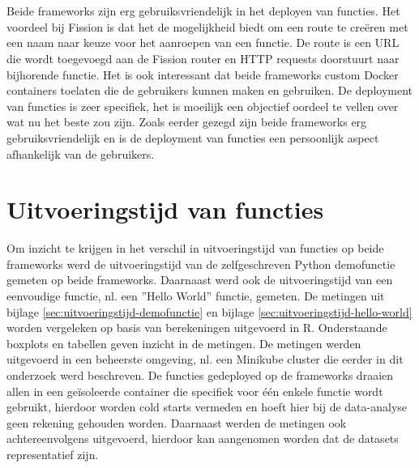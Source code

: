 \\\\
Beide frameworks zijn erg gebruiksvriendelijk in het deployen van functies. Het voordeel bij Fission is dat het de mogelijkheid biedt om een route te creëren met een naam naar keuze voor het aanroepen van een functie. De route is een URL die wordt toegevoegd aan de Fission router en HTTP requests doorstuurt naar bijhorende functie. Het is ook interessant dat beide frameworks custom Docker containers toelaten die de gebruikers kunnen maken en gebruiken.
De deployment van functies is zeer specifiek, het is moeilijk een objectief oordeel te vellen over wat nu het beste zou zijn. Zoals eerder gezegd zijn beide frameworks erg gebruiksvriendelijk en is de deployment van functies een persoonlijk aspect afhankelijk van de gebruikers.

\section{Uitvoeringstijd van functies}
\label{sec:vergelijking-uitvoeringstijd}
Om inzicht te krijgen in het verschil in uitvoeringstijd van functies op beide frameworks werd de uitvoeringstijd van de zelfgeschreven Python demofunctie gemeten op beide frameworks. Daarnaast werd ook de uitvoeringstijd van een eenvoudige functie, nl. een ''Hello World'' functie, gemeten. De metingen uit bijlage \ref{sec:uitvoeringstijd-demofunctie} en bijlage \ref{sec:uitvoeringstijd-hello-world} worden vergeleken op basis van  berekeningen uitgevoerd in R. Onderstaande boxplots en tabellen geven inzicht in de metingen. De metingen werden uitgevoerd in een beheerste omgeving, nl. een Minikube cluster die eerder in dit onderzoek werd beschreven. De functies gedeployed op de frameworks draaien allen in een geïsoleerde container die specifiek voor één enkele functie wordt gebruikt, hierdoor worden cold starts vermeden en hoeft hier bij de data-analyse geen rekening gehouden worden. Daarnaast werden de metingen ook achtereenvolgens uitgevoerd, hierdoor kan aangenomen worden dat de datasets representatief zijn.

\newpage
